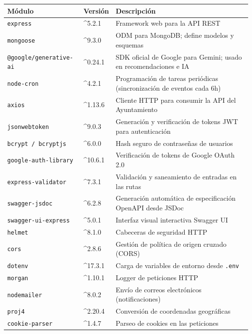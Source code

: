 \documentclass[12pt, a4paper]{article}
\begin{document}
\begin{center}
\begin{longtable}{p{4.2cm} p{1.8cm} p{7.5cm}}
  \toprule
  \textbf{Módulo} & \textbf{Versión} & \textbf{Descripción} \\
  \midrule
  \endhead
  \texttt{express}              & \^{}5.2.1  & Framework web para la API REST \\
  \texttt{mongoose}             & \^{}9.3.0  & ODM para MongoDB; define modelos y esquemas \\
  \texttt{@google/generative-ai}& \^{}0.24.1 & SDK oficial de Google para Gemini; usado en recomendaciones e IA \\
  \texttt{node-cron}            & \^{}4.2.1  & Programación de tareas periódicas (sincronización de eventos cada 6h) \\
  \texttt{axios}                & \^{}1.13.6 & Cliente HTTP para consumir la API del Ayuntamiento \\
  \texttt{jsonwebtoken}         & \^{}9.0.3  & Generación y verificación de tokens JWT para autenticación \\
  \texttt{bcrypt / bcryptjs}    & \^{}6.0.0  & Hash seguro de contraseñas de usuarios \\
  \texttt{google-auth-library}  & \^{}10.6.1 & Verificación de tokens de Google OAuth 2.0 \\
  \texttt{express-validator}    & \^{}7.3.1  & Validación y saneamiento de entradas en las rutas \\
  \texttt{swagger-jsdoc}        & \^{}6.2.8  & Generación automática de especificación OpenAPI desde JSDoc \\
  \texttt{swagger-ui-express}   & \^{}5.0.1  & Interfaz visual interactiva Swagger UI \\
  \texttt{helmet}               & \^{}8.1.0  & Cabeceras de seguridad HTTP \\
  \texttt{cors}                 & \^{}2.8.6  & Gestión de política de origen cruzado (CORS) \\
  \texttt{dotenv}               & \^{}17.3.1 & Carga de variables de entorno desde \texttt{.env} \\
  \texttt{morgan}               & \^{}1.10.1 & Logger de peticiones HTTP \\
  \texttt{nodemailer}           & \^{}8.0.2  & Envío de correos electrónicos (notificaciones) \\
  \texttt{proj4}                & \^{}2.20.4 & Conversión de coordenadas geográficas \\
  \texttt{cookie-parser}        & \^{}1.4.7  & Parseo de cookies en las peticiones \\

\end{longtable}
\end{center}
\end{document}
